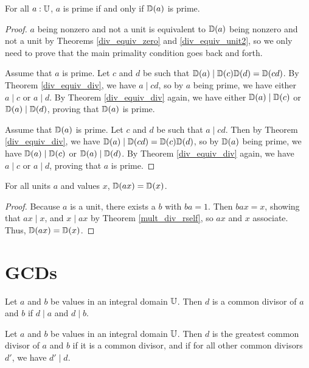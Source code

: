 \documentclass[../../math.tex]{subfiles}
\begin{document}
\begin{theorem} \label{div_equiv_prime}
    For all $a : \mathbb{U}$, $a$ is prime if and only if $\mathbb{D}(a)$ is prime.
\end{theorem}
\begin{proof}
    $a$ being nonzero and not a unit is equivalent to $\mathbb{D}(a)$ being nonzero and
    not a unit by Theorems \ref{div_equiv_zero} and \ref{div_equiv_unit2}, so we
    only need to prove that the main primality condition goes back and forth.

    Assume that $a$ is prime.  Let $c$ and $d$ be such that $\mathbb{D}(a) \mid \mathbb{D}(c)
    \mathbb{D}(d) = \mathbb{D}(cd)$.  By Theorem \ref{div_equiv_div}, we have $a \mid cd$, so by
    $a$ being prime, we have either $a \mid c$ or $a \mid d$.  By Theorem
    \ref{div_equiv_div} again, we have either $\mathbb{D}(a) \mid \mathbb{D}(c)$ or $\mathbb{D}(a) \mid
    \mathbb{D}(d)$, proving that $\mathbb{D}(a)$ is prime.

    Assume that $\mathbb{D}(a)$ is prime.  Let $c$ and $d$ be such that $a \mid cd$.
    Then by Theorem \ref{div_equiv_div}, we have $\mathbb{D}(a) \mid \mathbb{D}(cd) = \mathbb{D}(c)
    \mathbb{D}(d)$, so by $\mathbb{D}(a)$ being prime, we have $\mathbb{D}(a) \mid \mathbb{D}(c)$ or $\mathbb{D}(a) \mid
    \mathbb{D}(d)$.  By Theorem \ref{div_equiv_div} again, we have $a \mid c$ or $a \mid
    d$, proving that $a$ is prime.
\end{proof}

\begin{theorem}
    For all units $a$ and values $x$, $\mathbb{D}(ax) = \mathbb{D}(x)$.
\end{theorem}
\begin{proof}
    Because $a$ is a unit, there exists a $b$ with $ba = 1$.  Then $bax = x$,
    showing that $ax \mid x$, and $x \mid ax$ by Theorem \ref{mult_div_rself},
    so $ax$ and $x$ associate.  Thus, $\mathbb{D}(ax) = \mathbb{D}(x)$.
\end{proof}

\section{GCDs}

\begin{definition}
    Let $a$ and $b$ be values in an integral domain $\mathbb{U}$.  Then $d$ is a common
    divisor of $a$ and $b$ if $d \mid a$ and $d \mid b$.
\end{definition}

\begin{definition}
    Let $a$ and $b$ be values in an integral domain $\mathbb{U}$.  Then $d$ is the
    greatest common divisor of $a$ and $b$ if it is a common divisor, and if for
    all other common divisors $d'$, we have $d' \mid d$.
\end{definition}
\end{document}
